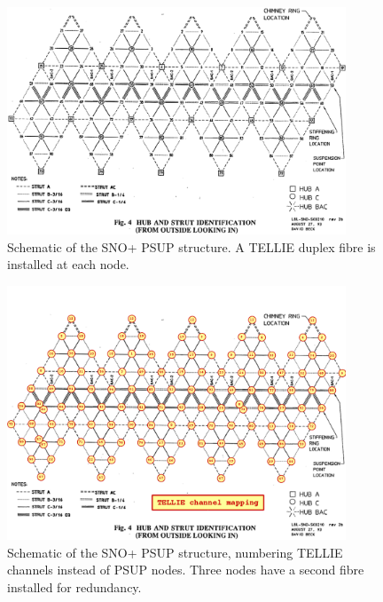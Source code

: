 \documentclass[12pt]{report}
\begin{document}
\begin{figure}[htp]
	\begin{center}
		\includegraphics[width=0.9\textwidth]{NodePanelMap}
		\caption{Schematic of the SNO+ PSUP structure. A TELLIE duplex fibre is installed at each node.}
		\label{fig:NodePanelMap}
	\end{center}
\end{figure}

\begin{figure}[htp]
	\begin{center}
		\includegraphics[width=0.9\textwidth]{NodeChannelMap}
		\caption{Schematic of the SNO+ PSUP structure, numbering TELLIE channels instead of PSUP nodes. Three nodes have a second fibre installed for redundancy.}
		\label{fig:NodeChannelMap}
	\end{center}
\end{figure}
\end{document}
